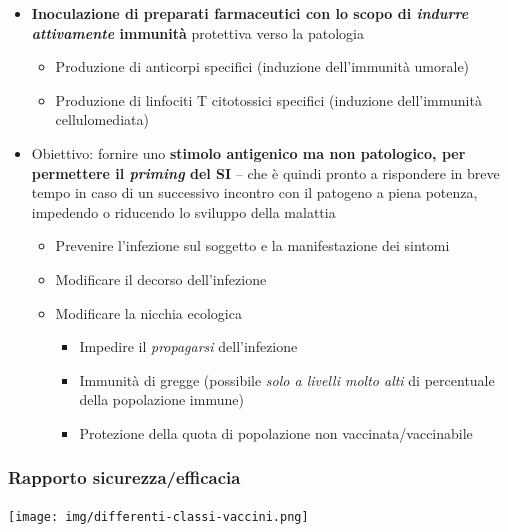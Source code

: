 \documentclass[italian,]{article}
\providecommand{\tightlist}{%
  \setlength{\itemsep}{0pt}\setlength{\parskip}{0pt}}
\begin{document}
\begin{itemize}
\tightlist
\item
  \textbf{Inoculazione di preparati farmaceutici con lo scopo di
  \emph{indurre attivamente} immunità} protettiva verso la patologia

  \begin{itemize}
  \tightlist
  \item
    Produzione di anticorpi specifici (induzione dell'immunità umorale)
  \item
    Produzione di linfociti T citotossici specifici (induzione
    dell'immunità cellulomediata)
  \end{itemize}
\item
  Obiettivo: fornire uno \textbf{stimolo antigenico ma non patologico,
  per permettere il \emph{priming} del SI} -- che è quindi pronto a
  rispondere in breve tempo in caso di un successivo incontro con il
  patogeno a piena potenza, impedendo o riducendo lo sviluppo della
  malattia

  \begin{itemize}
  \tightlist
  \item
    Prevenire l'infezione sul soggetto e la manifestazione dei sintomi
  \item
    Modificare il decorso dell'infezione
  \item
    Modificare la nicchia ecologica

    \begin{itemize}
    \tightlist
    \item
      Impedire il \emph{propagarsi} dell'infezione
    \item
      Immunità di gregge (possibile \emph{solo a livelli molto alti} di
      percentuale della popolazione immune)
    \item
      Protezione della quota di popolazione non vaccinata/vaccinabile
    \end{itemize}
  \end{itemize}
\end{itemize}

\hypertarget{rapporto-sicurezzaefficacia}{%
\subsubsection{Rapporto
sicurezza/efficacia}\label{rapporto-sicurezzaefficacia}}

\texttt{[image: img/differenti-classi-vaccini.png]}~
\end{document}
